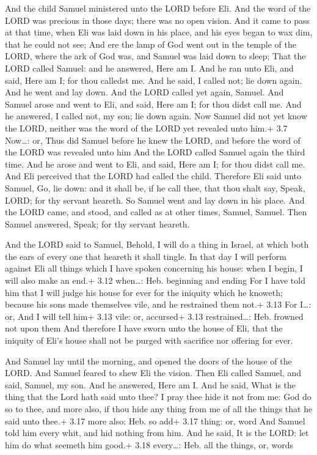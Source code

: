  And the child Samuel ministered unto the LORD before Eli.
And the word of the LORD was precious in those days; there was no open
vision.  And it came to pass at that time, when Eli was laid
down in his place, and his eyes began to wax dim, that he could not see;
 And ere the lamp of God went out in the temple of the LORD,
where the ark of God was, and Samuel was laid down to sleep;
 That the LORD called Samuel: and he answered, Here am I.
 And he ran unto Eli, and said, Here am I; for thou calledst
me. And he said, I called not; lie down again. And he went and lay down.
 And the LORD called yet again, Samuel. And Samuel arose and
went to Eli, and said, Here am I; for thou didst call me. And he
answered, I called not, my son; lie down again.  Now Samuel
did not yet know the LORD, neither was the word of the LORD yet revealed
unto him.+ 3.7 Now\ldots: or, Thus did Samuel before he knew the LORD,
and before the word of the LORD was revealed unto him  And
the LORD called Samuel again the third time. And he arose and went to
Eli, and said, Here am I; for thou didst call me. And Eli perceived that
the LORD had called the child.  Therefore Eli said unto
Samuel, Go, lie down: and it shall be, if he call thee, that thou shalt
say, Speak, LORD; for thy servant heareth. So Samuel went and lay down
in his place.  And the LORD came, and stood, and called as
at other times, Samuel, Samuel. Then Samuel answered, Speak; for thy
servant heareth.

 And the LORD said to Samuel, Behold, I will do a thing
in Israel, at which both the ears of every one that heareth it shall
tingle.  In that day I will perform against Eli all things
which I have spoken concerning his house: when I begin, I will also make
an end.+ 3.12 when\ldots: Heb. beginning and ending  For I
have told him that I will judge his house for ever for the iniquity
which he knoweth; because his sons made themselves vile, and he
restrained them not.+ 3.13 For I\ldots: or, And I will tell him+ 3.13
vile: or, accursed+ 3.13 restrained\ldots: Heb. frowned not upon them
 And therefore I have sworn unto the house of Eli, that the
iniquity of Eli's house shall not be purged with sacrifice nor offering
for ever.

 And Samuel lay until the morning, and opened the doors
of the house of the LORD. And Samuel feared to shew Eli the vision.
 Then Eli called Samuel, and said, Samuel, my son. And he
answered, Here am I.  And he said, What is the thing that
the Lord hath said unto thee? I pray thee hide it not from me: God do so
to thee, and more also, if thou hide any thing from me of all the things
that he said unto thee.+ 3.17 more also: Heb. so add+ 3.17 thing: or,
word  And Samuel told him every whit, and hid nothing from
him. And he said, It is the LORD: let him do what seemeth him good.+
3.18 every\ldots: Heb. all the things, or, words

